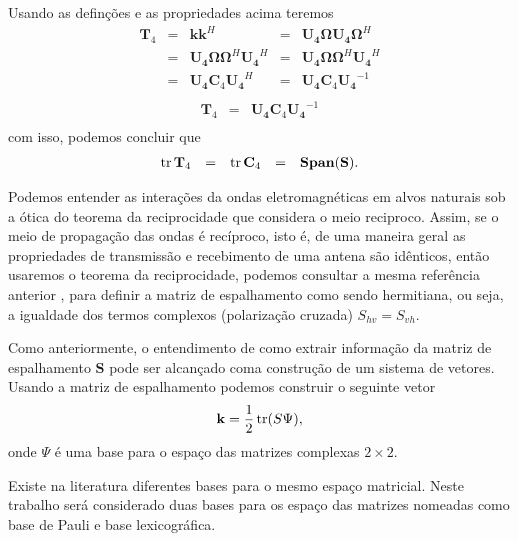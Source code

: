 Usando as definções e as propriedades acima teremos
\begin{equation}\nonumber
\begin{array}{rrrrr}
	\mathbf{T}_4&=&\mathbf{k}\mathbf{k}^H&=&\mathbf{U_4\Omega}\mathbf{U_4\Omega}^H	\\
	   &=&\mathbf{U_4\Omega}\mathbf{\Omega}^H\mathbf{U_4}^H&=&\mathbf{U_4}\mathbf{\Omega}\mathbf{\Omega}^H\mathbf{U_4}^H	\\
	   &=&\mathbf{U_4}\mathbf{C}_4\mathbf{U_4}^H&=&\mathbf{U_4}\mathbf{C}_4\mathbf{U_4}^{-1}\\
\end{array}
\end{equation}
\begin{equation}\label{matriz_simil_t4_c4}
\begin{array}{rrr}
	 \mathbf{T}_4  &=&\mathbf{U_4}\mathbf{C}_4\mathbf{U_4}^{-1}\\
\end{array}
\end{equation}
com isso, podemos concluir que
\begin{equation}\label{traco_t4_c4}
\begin{array}{rrrrr}
	\operatorname{tr}{\mathbf{T}_4}  &=&\operatorname{tr}{\mathbf{C}_4}&=&\mathbf{Span(S)}.\\
\end{array}
\end{equation}


Podemos entender as interações da ondas eletromagnéticas em alvos naturais sob a ótica do teorema da reciprocidade que considera o meio reciproco. Assim, se o meio de propagação das ondas é recíproco, isto é, de uma maneira geral as propriedades de transmissão e recebimento de uma antena são idênticos, então usaremos o teorema da reciprocidade, podemos consultar a mesma referência anterior \citet{lp}, para definir a matriz de espalhamento como sendo hermitiana, ou seja, a igualdade dos termos complexos (polarização cruzada) $S_{hv}=S_{vh}$. 

Como anteriormente, o entendimento de como extrair informação da matriz de espalhamento $\mathbf{S}$ pode ser alcançado coma construção de um sistema de vetores. Usando a matriz de espalhamento podemos construir o seguinte vetor
\begin{equation}\label{def_vet_espalhamento}
\mathbf{k}=\frac{1}{2} \operatorname{tr}(S\Psi),
\end{equation}
onde $\Psi$ é uma base para o espaço das matrizes complexas $2\times 2$.

Existe na literatura diferentes bases para o mesmo espaço matricial. Neste trabalho será considerado duas bases para os espaço das matrizes nomeadas como base de Pauli e base lexicográfica.	

